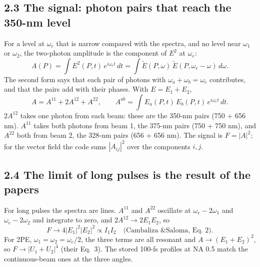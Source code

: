 \documentclass[10pt]{article}
\begin{document}
\subsection*{2.3 The signal: photon pairs that reach the 350-nm level}
For a level at $\omega_e$ that is narrow compared with the spectra, and no level near $\omega_1$ or $\omega_2$, the
two-photon amplitude is the component of $E^2$ at $\omega_e$:
\begin{equation}A(P) = \int E^2(P,t)\,e^{i\omega_et}\,dt = \int\tilde E(P,\omega)\,\tilde E(P,\omega_e-\omega)\,d\omega .\end{equation}
The second form says that each pair of photons with $\omega_a + \omega_b = \omega_e$ contributes, and that the
pairs add with their phases. With $E = E_1 + E_2$,
\begin{equation}A = A^{11} + 2A^{12} + A^{22},\qquad A^{ab} = \int E_a(P,t)\,E_b(P,t)\,e^{i\omega_et}\,dt .\end{equation}
$2A^{12}$ takes one photon from each beam: these are the 350-nm pairs (750 + 656 nm). $A^{11}$ takes both photons
from beam 1, the 375-nm pairs (750 + 750 nm), and $A^{22}$ both from beam 2, the 328-nm pairs (656 + 656 nm). The
signal is $F = |A|^2$; for the vector field the code sums $|A_{ij}|^2$ over the components $i, j$.

\subsection*{2.4 The limit of long pulses is the result of the papers}
For long pulses the spectra are lines. $A^{11}$ and $A^{22}$ oscillate at $\omega_e - 2\omega_1$ and
$\omega_e - 2\omega_2$ and integrate to zero, and $2A^{12} \to 2E_1E_2$, so
\begin{equation}F \to 4|E_1|^2|E_2|^2 \propto I_1I_2\quad\text{(Cambaliza \& Saloma, Eq.~2).}\end{equation}
For 2PE, $\omega_1 = \omega_2 = \omega_e/2$, the three terms are all resonant and
$A \to (E_1 + E_2)^2$, so $F \to |U_1 + U_2|^4$ (their Eq.~3). The stored 100-fs profiles at NA 0.5 match the
continuous-beam ones at the three angles.
\end{document}

